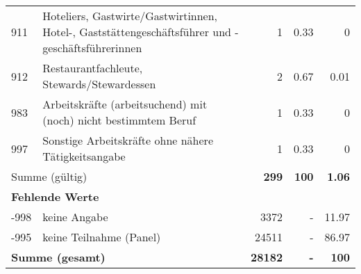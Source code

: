 \begin{longtable}{lXrrr}
        911 & \multicolumn{1}{X}{Hoteliers, Gastwirte/Gastwirtinnen, Hotel-, Gaststättengeschäftsführer und -geschäftsführerinnen} & %
          \num{1} &
          \num[round-mode=places,round-precision=2]{0.33} &
          \num[round-mode=places,round-precision=2]{0} \\

        912 & \multicolumn{1}{X}{Restaurantfachleute, Stewards/Stewardessen} & %
          \num{2} &
          \num[round-mode=places,round-precision=2]{0.67} &
          \num[round-mode=places,round-precision=2]{0.01} \\

        983 & \multicolumn{1}{X}{Arbeitskräfte (arbeitsuchend) mit (noch) nicht bestimmtem Beruf} & %
          \num{1} &
          \num[round-mode=places,round-precision=2]{0.33} &
          \num[round-mode=places,round-precision=2]{0} \\

        997 & \multicolumn{1}{X}{Sonstige Arbeitskräfte ohne nähere Tätigkeitsangabe} & %
          \num{1} &
          \num[round-mode=places,round-precision=2]{0.33} &
          \num[round-mode=places,round-precision=2]{0} \\

     \midrule
     \multicolumn{2}{l}{Summe (gültig)} &
       \textbf{\num{299}} &
     \textbf{100} &
       \textbf{\num[round-mode=places,round-precision=2]{1.06}} \\
     \multicolumn{5}{l}{\textbf{Fehlende Werte}}\\
       -998 &
       keine Angabe &
         \num{3372} &
        - &
         \num[round-mode=places,round-precision=2]{11.97} \\
       -995 &
       keine Teilnahme (Panel) &
         \num{24511} &
        - &
         \num[round-mode=places,round-precision=2]{86.97} \\
     \midrule
     \multicolumn{2}{l}{\textbf{Summe (gesamt)}} &
          \textbf{\num{28182}} &
        \textbf{-} &
        \textbf{100} \\
     \bottomrule
     \end{longtable}
     
